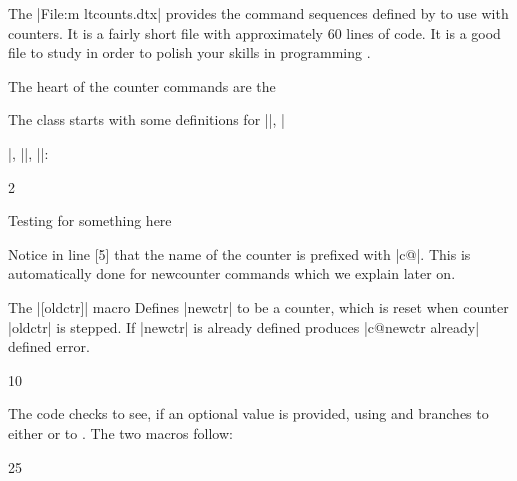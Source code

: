 {\centering {}\par}


The |File:m ltcounts.dtx| provides the command sequences defined by \latex to use with counters. It is a fairly short file with approximately 
60 lines of code. It is a good file to study in order to polish your skills in programming \tex. 

The heart of the counter commands are the 

The class starts with some definitions for |\setcounter|, |\addtocounter|, |\newcounter|, |\value|:


\begin{teXXX}
2 \def\setcounter#1#2{%
3   \@ifundefined{c@#1}%
4      {\@nocounterr{#1}}%
5      {\global\csname c@#1\endcsname#2\relax}}
\end{teXXX}


Testing for something here

Notice in line [5] that the name of the counter is prefixed with |c@|. This is automatically done for newcounter commands which we explain later on.



\begin{macro}{\newcounter}
The |[oldctr]| macro  Defines |newctr| to be a counter, which is
reset when counter |oldctr|  is stepped. If |newctr| is  already defined produces
|c@newctr already| defined  error.
\end{macro}

\begin{teXXX}
10 \def\newcounter#1{%
11   \expandafter\@ifdefinable \csname c@#1\endcsname
12   {\@definecounter{#1}}%
13   \@ifnextchar[{\@newctr{#1}}{}}
\end{teXXX}

The code checks to see, if an optional value is provided, using  and branches to either
 or to . The two macros follow:

\begin{teXXX}
25 \def\@definecounter#1{\expandafter\newcount\csname c@#1\endcsname
26   \setcounter{#1}\z@
27   \global\expandafter\let\csname cl@#1\endcsname\@empty
28   \@addtoreset{#1}{@ckpt}%
29   \global\expandafter\let\csname p@#1\endcsname\@empty
30   \expandafter
31   \gdef\csname the#1\expandafter\endcsname\expandafter
32       {\expandafter\@arabic\csname c@#1\endcsname}
}
\end{teXXX}

